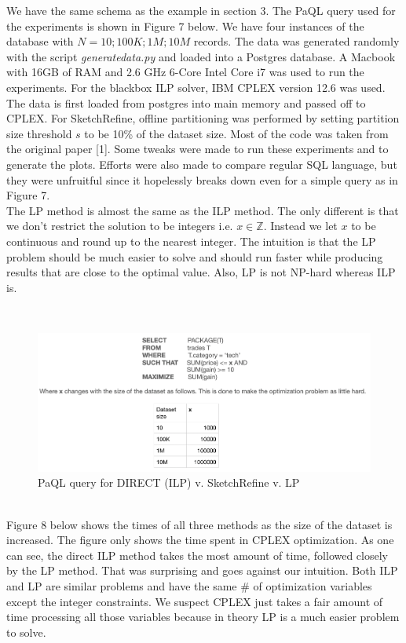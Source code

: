 \documentclass[a4paper,12pt]{article}
\begin{document}
We have the same schema as the example in section 3. The PaQL query used for the experiments is shown in Figure 7 below. We have four instances of the database with $N = 10; 100K; 1M; 10M $ records. The data was generated randomly with the script \textit{generate\textunderscore data.py} and loaded into a Postgres database. A Macbook with 16GB of RAM and 2.6 GHz 6-Core Intel Core i7 was used to run the experiments. For the blackbox ILP solver, IBM CPLEX version 12.6 was used. The data is first loaded from postgres into main memory and passed off to CPLEX. For SketchRefine, offline partitioning was performed by setting partition size threshold $s$ to be 10\% of the dataset size.  Most of the code was taken from the original paper [1]. Some tweaks were made to run these experiments and to generate the plots. Efforts were also made to compare regular SQL language, but they were unfruitful since it hopelessly breaks down even for a simple query as in Figure 7.
\\

The LP method is almost the same as the ILP method. The only different is that we don't restrict the solution to be integers i.e. $x \in \mathbb{Z}$. Instead we let $x$ to be continuous and round up to the nearest integer. The intuition is that the LP problem should be much easier to solve and should run faster while producing results that are close to the optimal value. Also, LP is not NP-hard whereas ILP is. 

\\
\begin{figure}[h]
\includegraphics[scale=.6]{9}
\caption{PaQL query for DIRECT (ILP) v. SketchRefine v. LP }
\centering
\end{figure}
\\
Figure 8 below shows the times of all three methods as the size of the dataset is increased. The figure only shows the time spent in CPLEX optimization. As one can see, the direct ILP method takes the most amount of time, followed closely by the LP method. That was surprising and goes against our intuition. Both ILP and LP are similar problems and have the same # of optimization variables except the integer constraints. We suspect CPLEX just takes a fair amount of time processing all those variables because in theory LP is a much easier problem to solve. 
\\
\end{document}
